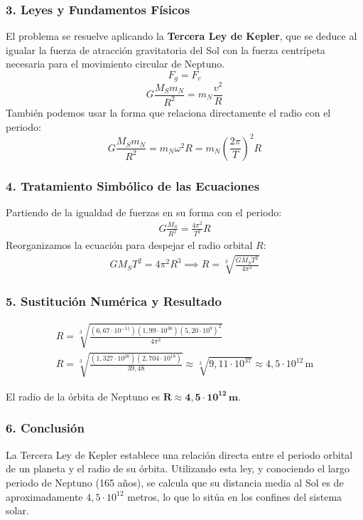 \subsubsection*{3. Leyes y Fundamentos Físicos}
El problema se resuelve aplicando la \textbf{Tercera Ley de Kepler}, que se deduce al igualar la fuerza de atracción gravitatoria del Sol con la fuerza centrípeta necesaria para el movimiento circular de Neptuno.
$$ F_g = F_c $$
$$ G \frac{M_S m_N}{R^2} = m_N \frac{v^2}{R} $$
También podemos usar la forma que relaciona directamente el radio con el periodo:
$$ G \frac{M_S m_N}{R^2} = m_N \omega^2 R = m_N \left(\frac{2\pi}{T}\right)^2 R $$

\subsubsection*{4. Tratamiento Simbólico de las Ecuaciones}
Partiendo de la igualdad de fuerzas en su forma con el periodo:
\begin{gather}
    G \frac{M_S}{R^2} = \frac{4\pi^2}{T^2} R
\end{gather}
Reorganizamos la ecuación para despejar el radio orbital $R$:
\begin{gather}
    G M_S T^2 = 4\pi^2 R^3 \implies R = \sqrt[3]{\frac{G M_S T^2}{4\pi^2}}
\end{gather}

\subsubsection*{5. Sustitución Numérica y Resultado}
\begin{gather}
    R = \sqrt[3]{\frac{(6,67 \cdot 10^{-11})(1,99 \cdot 10^{30})(5,20 \cdot 10^9)^2}{4\pi^2}} \nonumber \\
    R = \sqrt[3]{\frac{(1,327 \cdot 10^{20})(2,704 \cdot 10^{19})}{39,48}} \approx \sqrt[3]{9,11 \cdot 10^{37}} \approx 4,5 \cdot 10^{12} \, \text{m}
\end{gather}
\begin{cajaresultado}
El radio de la órbita de Neptuno es $\boldsymbol{R \approx 4,5 \cdot 10^{12} \, \textbf{m}}$.
\end{cajaresultado}

\subsubsection*{6. Conclusión}
\begin{cajaconclusion}
La Tercera Ley de Kepler establece una relación directa entre el periodo orbital de un planeta y el radio de su órbita. Utilizando esta ley, y conociendo el largo periodo de Neptuno (165 años), se calcula que su distancia media al Sol es de aproximadamente $4,5 \cdot 10^{12}$ metros, lo que lo sitúa en los confines del sistema solar.
\end{cajaconclusion}

